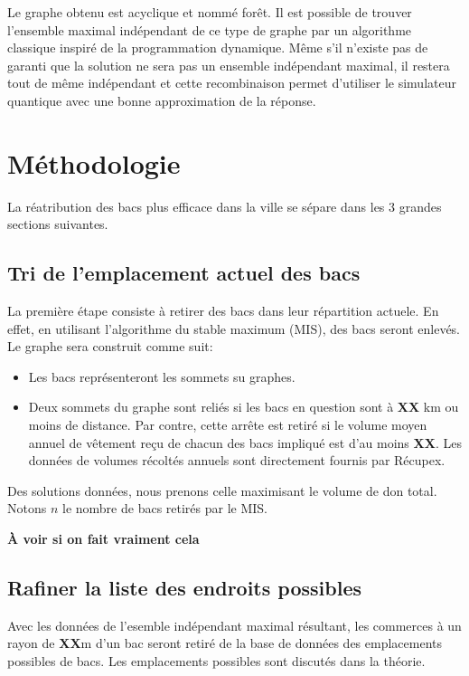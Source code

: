 \documentclass[11pt]{article}
\begin{document}
Le graphe obtenu est acyclique et nommé forêt. Il est possible de trouver l'ensemble maximal indépendant de ce type de graphe par un algorithme classique inspiré de la programmation dynamique. Même s'il n'existe pas de garanti que la solution ne sera pas un ensemble indépendant maximal, il restera tout de même indépendant et cette recombinaison permet d'utiliser le simulateur quantique avec une bonne approximation de la réponse.

\section{Méthodologie}
La réatribution des bacs plus efficace dans la ville se sépare dans les 3 grandes sections suivantes.

\subsection{Tri de l'emplacement actuel des bacs}
La première étape consiste à retirer des bacs dans leur répartition actuele. En effet, en utilisant l'algorithme du stable maximum (MIS), des bacs seront enlevés. Le graphe sera construit comme suit:
\begin{itemize}
    \item Les bacs représenteront les sommets su graphes.
    \item Deux sommets du graphe sont reliés si les bacs en question sont à \textbf{XX} km ou moins de distance. Par contre, cette arrête est retiré si le volume moyen annuel de vêtement reçu de chacun des bacs impliqué est d'au moins  \textbf{XX}. Les données de volumes récoltés annuels sont directement fournis par Récupex.
\end{itemize}
Des solutions données, nous prenons celle maximisant le volume de don total. Notons $n$ le nombre de bacs retirés par le MIS.

\textbf{À voir si on fait vraiment cela}


\subsection{Rafiner la liste des endroits possibles}
Avec les données de l'esemble indépendant maximal résultant, les commerces à un rayon de \textbf{XX}m d'un bac seront retiré de la base de données des emplacements possibles de bacs. Les emplacements possibles sont discutés dans la théorie.
\end{document}
